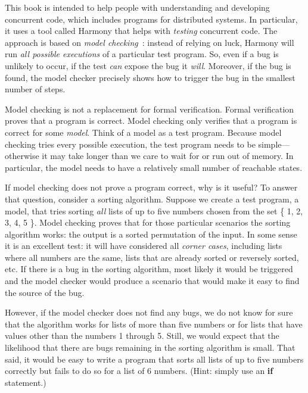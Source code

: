 \documentclass{report}
\begin{document}
This book is intended to help people with understanding and
developing concurrent code, which includes programs for distributed
systems.  In particular, it uses a tool
called Harmony that helps with \emph{testing} concurrent code.
The approach is based on \emph{model checking}~\cite{CES86}:
%
instead of relying
on luck, Harmony will run \emph{all possible executions} of a particular
test program.  So, even if a bug is unlikely to occur, if the test
\emph{can} expose the bug it \emph{will}.  Moreover, if the bug is
found, the model checker precisely shows how to trigger the bug in
the smallest number of steps.

Model checking is not a replacement for formal verification.
%
Formal verification proves that a program is correct.  Model checking only
verifies that a program is correct for some \emph{model}.  Think of
a model as a test program.
Because model checking tries every possible execution, the test
program needs to be simple---otherwise it may take longer than we
care to wait for or run out of memory.
In particular, the model needs to have a relatively small number of
reachable states.

If model checking does not prove a program correct, why is it
useful?
To answer that question, consider a sorting algorithm.
Suppose we create a test program, a model, that tries sorting
\emph{all} lists of up to five numbers chosen from the set
\{ 1, 2, 3, 4, 5 \}.  Model checking proves that for those particular
scenarios the sorting algorithm works: the output is a sorted
permutation of the input.  In some sense it is an excellent test:
it will have considered all \emph{corner cases},
%
including lists where all
numbers are the same, lists that are already sorted or reversely
sorted, etc.  If there is a bug in the sorting algorithm, most
likely it would be triggered and the model checker would produce a
scenario that would make it easy to find the source of the bug.

However, if the model checker does not find any bugs, we do not
know for sure that the algorithm works for lists of more than
five numbers or for lists that have values other than the numbers
1 through 5.  Still, we would expect that the likelihood that there
are bugs remaining in the sorting algorithm is small.
That said, it would be easy to write a program
that sorts all lists of up to five numbers correctly but fails to
do so for a list of 6 numbers.  (Hint: simply use an \textbf{if}
statement.)
\end{document}
